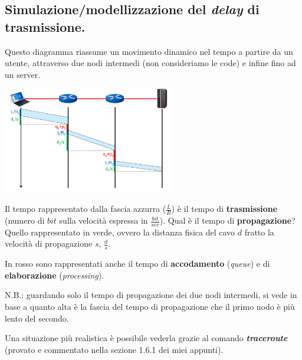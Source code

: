 \documentclass[10pt, a4paper, openany]{book}
\begin{document}
\subsection{Simulazione/modellizzazione del \textit{delay} di trasmissione.}

\noindent Questo diagramma riassume un movimento dinamico nel tempo a partire da un utente, attraverso due nodi intermedi (non consideriamo le code) e infine fino ad un server.
\begin{center}
    \includegraphics[width=75mm]{cap1 - Introduzione alle reti - 27.jpg}
\end{center}
\noindent Il tempo rappresentato dalla fascia azzurra ($\frac{L}{R}$) è il tempo di \textbf{trasmissione} (numero di $bit$ sulla velocità espressa in $\frac{bit}{sec}$). Qual è il tempo di \textbf{propagazione}? Quello rappresentato in verde, ovvero la distanza fisica del cavo $d$ fratto la velocità di propagazione $s$, $\frac{d}{s}$.

\noindent In rosso sono rappresentati anche il tempo di \textbf{accodamento} (\textit{queue}) e di \textbf{elaborazione} (\textit{processing}).

\noindent N.B.: guardando solo il tempo di propagazione dei due nodi intermedi, si vede in base a quanto alta è la fascia del tempo di propagazione che il primo nodo è più lento del secondo.

\noindent Una situazione più realistica è possibile vederla grazie al comando \textit{\textbf{traceroute}} (provato e commentato nella sezione 1.6.1 dei miei appunti).
\end{document}
